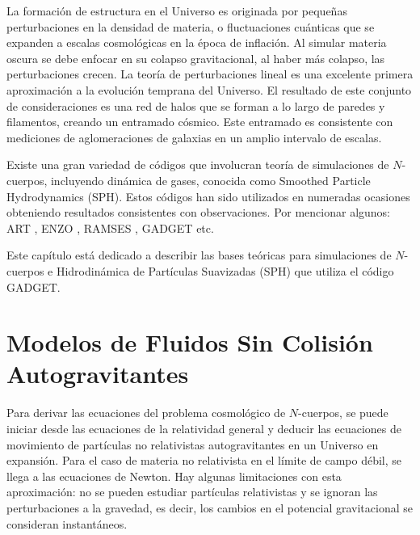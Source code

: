 \documentclass[a4paper,openright,12pt]{book}
\begin{document}
La formación de estructura en el Universo es originada por pequeñas perturbaciones en la densidad de materia, o fluctuaciones cuánticas que se expanden a escalas cosmológicas en la época de inflación. Al simular materia oscura se debe enfocar en su colapso gravitacional, al haber más colapso, las perturbaciones crecen. La teoría de perturbaciones lineal es una excelente primera aproximación a la evolución temprana del Universo. El resultado de este conjunto de consideraciones es una red de halos que se forman a lo largo de paredes y filamentos, creando un entramado cósmico. Este entramado es consistente con mediciones de aglomeraciones de galaxias en un amplio intervalo de escalas.

Existe una gran variedad de códigos que involucran teoría de simulaciones de $N$-cuerpos, incluyendo dinámica de gases, conocida como Smoothed Particle Hydrodynamics (SPH). Estos códigos han sido utilizados en numeradas ocasiones obteniendo resultados consistentes con observaciones. Por mencionar algunos: ART \cite{2.1.1}, ENZO \cite{2.1.2}, RAMSES \cite{2.1.3}, GADGET \cite{b4} etc.

Este capítulo está dedicado a describir las bases teóricas para simulaciones de $N$-cuerpos e Hidrodinámica de Partículas Suavizadas (SPH) que utiliza el código GADGET.

\section{Modelos de Fluidos Sin Colisión Autogravitantes}
Para derivar las ecuaciones del problema cosmológico de $N$-cuerpos, se puede iniciar desde las ecuaciones de la relatividad general y deducir las ecuaciones de movimiento de partículas no relativistas autogravitantes en un Universo en expansión. Para el caso de materia no relativista en el límite de campo débil, se llega a las ecuaciones de Newton. Hay algunas limitaciones con esta aproximación: no se pueden estudiar partículas relativistas y se ignoran las perturbaciones a la gravedad, es decir, los cambios en el potencial gravitacional se consideran instantáneos.
\end{document}

